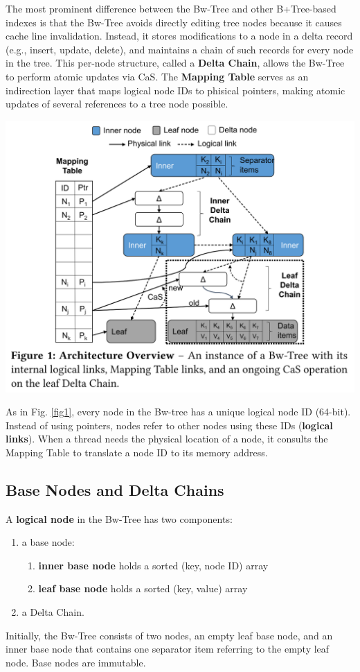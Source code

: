 \documentclass[11pt]{article}
\begin{document}
The most prominent difference between the Bw-Tree and other B+Tree-based indexes is that the Bw-Tree
avoids directly editing tree nodes because it causes cache line invalidation. Instead, it stores
modifications to a node in a delta record (e.g., insert, update, delete), and maintains a chain of
such records for every node in the tree. This per-node structure, called a \textbf{Delta Chain}, allows the
Bw-Tree to perform atomic updates via CaS. The \textbf{Mapping Table} serves as an indirection layer that maps
logical node IDs to phisical pointers, making atomic updates of several references to a tree node
possible.

\begin{center}
\includegraphics[width=.9\textwidth]{../../images/db/29.png}
\label{fig1}
\end{center}

As in Fig. \ref{fig1}, every node in the Bw-tree has a unique logical node ID (64-bit). Instead of
using pointers, nodes refer to other nodes using these IDs (\textbf{logical links}). When a thread needs the
physical location of a node, it consults the Mapping Table to translate a node ID to its memory
address.
\subsection{Base Nodes and Delta Chains}
\label{sec:org9f0a616}
A \textbf{logical node} in the Bw-Tree has two components:
\begin{enumerate}
\item a base node:
\begin{enumerate}
\item \textbf{inner base node} holds a sorted (key, node ID) array
\item \textbf{leaf base node} holds a sorted (key, value) array
\end{enumerate}
\item a Delta Chain.
\end{enumerate}
Initially, the Bw-Tree consists of two nodes, an empty leaf base node, and an inner base node that
contains one separator item referring to the empty leaf node. Base nodes are immutable.
\end{document}
